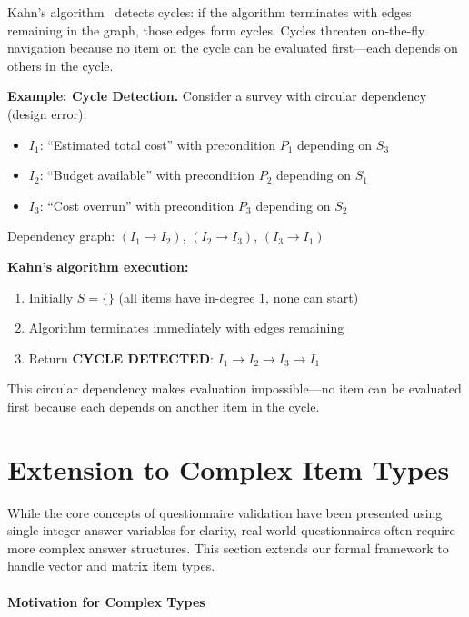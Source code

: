 Kahn's algorithm~\cite{cormen2009introduction} detects cycles: if the algorithm terminates with edges remaining in the graph, those edges form cycles. Cycles threaten on-the-fly navigation because no item on the cycle can be evaluated first—each depends on others in the cycle.

\begin{mdframed}
\noindent\textbf{Example: Cycle Detection.} Consider a survey with circular dependency (design error):
\begin{itemize}
    \item $I_1$: ``Estimated total cost'' with precondition $P_1$ depending on $S_3$
    \item $I_2$: ``Budget available'' with precondition $P_2$ depending on $S_1$
    \item $I_3$: ``Cost overrun'' with precondition $P_3$ depending on $S_2$
\end{itemize}

Dependency graph: $(I_1 \to I_2)$, $(I_2 \to I_3)$, $(I_3 \to I_1)$

\textbf{Kahn's algorithm execution:}
\begin{enumerate}
    \item Initially $S = \{\}$ (all items have in-degree 1, none can start)
    \item Algorithm terminates immediately with edges remaining
    \item Return \textbf{CYCLE DETECTED}: $I_1 \to I_2 \to I_3 \to I_1$
\end{enumerate}

This circular dependency makes evaluation impossible—no item can be evaluated first because each depends on another item in the cycle.
\end{mdframed}

\section{Extension to Complex Item Types}
\label{sec:complex-types}

While the core concepts of questionnaire validation have been presented using single integer answer variables for clarity, real-world questionnaires often require more complex answer structures. This section extends our formal framework to handle vector and matrix item types.

\paragraph{Motivation for Complex Types}

